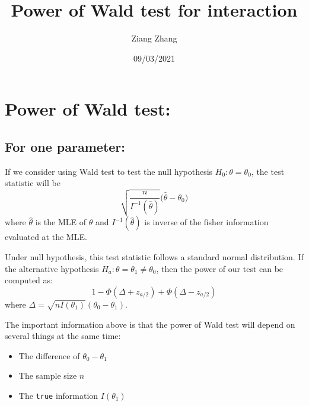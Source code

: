 \documentclass[]{article}
\title{Power of Wald test for interaction}
\author{Ziang Zhang}
\date{09/03/2021}
\providecommand{\tightlist}{%
  \setlength{\itemsep}{0pt}\setlength{\parskip}{0pt}}
\begin{document}
\maketitle

{
\setcounter{tocdepth}{2}
\tableofcontents
}
\hypertarget{power-of-wald-test}{%
\section{Power of Wald test:}\label{power-of-wald-test}}

\hypertarget{for-one-parameter}{%
\subsection{For one parameter:}\label{for-one-parameter}}

If we consider using Wald test to test the null hypothesis
\(H_0:\theta=\theta_0\), the test statistic will be
\[\sqrt{\frac{n}{I^{-1}(\hat{\theta})}}\bigg(\hat{\theta} - \theta_0\bigg)\]
where \(\hat{\theta}\) is the MLE of \(\theta\) and
\(I^{-1}(\hat{\theta})\) is inverse of the fisher information evaluated
at the MLE.

Under null hypothesis, this test statistic follows a standard normal
distribution. If the alternative hypothesis
\(H_a:\theta=\theta_1 \neq \theta_0\), then the power of our test can be
computed as: \[1-\Phi(\Delta+z_{a/2}) + \Phi(\Delta-z_{a/2})\] where
\(\Delta = \sqrt{n I(\theta_1)}(\theta_0-\theta_1)\).

The important information above is that the power of Wald test will
depend on several things at the same time:

\begin{itemize}
\tightlist
\item
  The difference of \(\theta_0 - \theta_1\)
\item
  The sample size \(n\)
\item
  The \texttt{true} information \(I(\theta_1)\)
\end{itemize}
\end{document}
